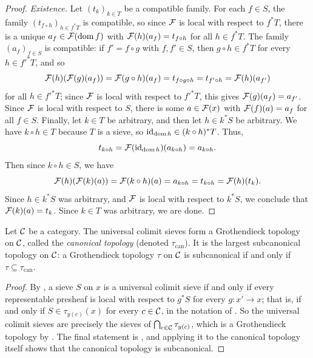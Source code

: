 \begin{proof}
    \emph{Existence.} Let $(t_k)_{k \in T}$ be a compatible family. For each $f \in S$, the family $(t_{f \circ h})_{h \in f^* T}$ is compatible, so since $\cal{F}$ is local with respect to $f^* T$, there is a unique $a_f \in \cal{F}(\dom f)$ with $\cal{F}(h)(a_f) = t_{f \circ h}$ for all $h \in f^* T$. The family $(a_f)_{f \in S}$ is compatible: if $f' = f \circ g$ with $f, f' \in S$, then $g \circ h \in f^* T$ for every $h \in f'^* T$, and so
    \[\cal{F}(h)(\cal{F}(g)(a_f)) = \cal{F}(g \circ h)(a_f) = t_{f \circ g \circ h} = t_{f' \circ h} = \cal{F}(h)(a_{f'})\]
    for all $h \in f'^* T$; since $\cal{F}$ is local with respect to $f'^* T$, this gives $\cal{F}(g)(a_f) = a_{f'}$. Since $\cal{F}$ is local with respect to $S$, there is some $a \in \cal{F}(x)$ with $\cal{F}(f)(a) = a_f$ for all $f \in S$. Finally, let $k \in T$ be arbitrary, and then let $h \in k^* S$ be arbitrary. We have $k \circ h \in T$ because $T$ is a sieve, so $\id_{\dom h} \in (k \circ h)^* T$. Thus,
    \[t_{k \circ h} = \cal{F}(\id_{\dom h})(a_{k \circ h}) = a_{k \circ h}.\]
    Then since $k \circ h \in S$, we have
    \[\cal{F}(h)(\cal{F}(k)(a)) = \cal{F}(k \circ h)(a) = a_{k \circ h} = t_{k \circ h} = \cal{F}(h)(t_k).\]
    Since $h \in k^* S$ was arbitrary, and $\cal{F}$ is local with respect to $k^* S$, we conclude that $\cal{F}(k)(a) = t_k$. Since $k \in T$ was arbitrary, we are done.
\end{proof}
\begin{theorem}\label{thm:chap:sheaves:sec:sites:canonical topology}
    Let $\catC$ be a category. The universal colimit sieves form a Grothendieck topology on $\catC$, called the \emph{canonical topology} (denoted $\tau_{\mathrm{can}}$). It is the largest subcanonical topology on $\catC$: a Grothendieck topology $\tau$ on $\catC$ is subcanonical if and only if $\tau \subseteq \tau_{\mathrm{can}}$.
\end{theorem}
\begin{proof}
    By , a sieve $S$ on $x$ is a universal colimit sieve if and only if every representable presheaf is local with respect to $g^* S$ for every $g : x' \to x$; that is, if and only if $S \in \tau_{y(c)}(x)$ for every $c \in \catC$, in the notation of . So the universal colimit sieves are precisely the sieves of $\bigcap_{c \in \catC} \tau_{y(c)}$, which is a Grothendieck topology by . The final statement is , and applying it to the canonical topology itself shows that the canonical topology is subcanonical.
\end{proof}

